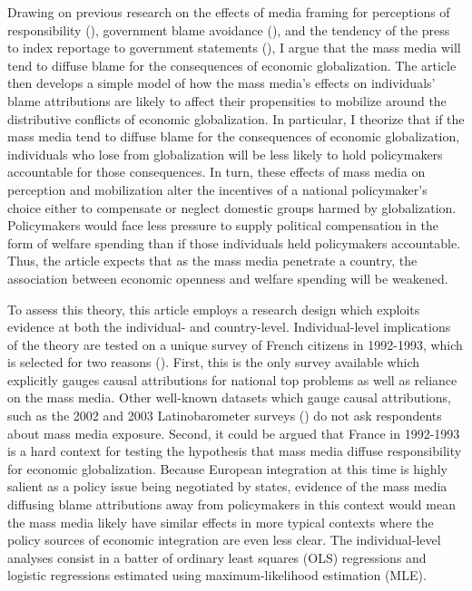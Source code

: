 \documentclass[12pt]{report}
\begin{document}
Drawing on previous research on the effects of media framing for perceptions of responsibility (\citealt{Iyengar:1991uf, Iyengar:1989tm}), government blame avoidance (\citealt{Weaver:1986ku, McGraw:1990kk}), and the tendency of the press to index reportage to government statements (\citealt{Bennett:1990bp, Zaller:1996vs}), I argue that the mass media will tend to diffuse blame for the consequences of economic globalization. The article then develops a simple model of how the mass media's effects on individuals' blame attributions are likely to affect their propensities to mobilize around the distributive conflicts of economic
globalization. In particular, I theorize that if the mass media tend to diffuse blame for the consequences of economic globalization, individuals who lose from globalization will be less likely to hold policymakers accountable for those consequences. In turn, these effects of mass media on perception and mobilization alter the incentives of a
national policymaker's choice either to compensate or neglect domestic groups harmed by
globalization. Policymakers would face less pressure to supply political compensation in the form of welfare spending than if those individuals held policymakers accountable. Thus, the article expects that as the mass media penetrate a country, the association between economic openness and welfare spending will be weakened.

To assess this theory, this article employs a research design which exploits evidence at both the individual- and country-level. Individual-level implications of the theory are tested on a unique survey of French citizens in
1992-1993, which is selected for two reasons (\citealt{Chrique:1993us}). First, this is the only survey available which explicitly gauges causal attributions for national top problems as well as reliance on the mass media. Other well-known datasets which gauge causal attributions, such as the 2002 and 2003 Latinobarometer surveys (\citealt{Alcaniz:2010gb}) do not ask respondents about mass media exposure. Second, it could be argued that France in 1992-1993 is a hard context for testing the hypothesis that mass media diffuse responsibility for economic globalization. Because European integration at this time is highly salient as a policy issue being negotiated by states, evidence of the mass media diffusing blame attributions away from policymakers in this context would mean the mass media likely have similar effects in more typical contexts where the policy sources of economic integration are even less clear. The individual-level analyses consist in a batter of ordinary least squares (OLS) regressions and logistic regressions estimated using maximum-likelihood estimation (MLE).
\end{document}
